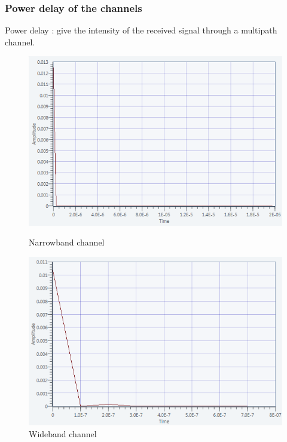 \documentclass[11pt]{beamer}
\begin{document}
\begin{frame}
\frametitle{Power delay of the channels}
 
Power delay : give the intensity of the received signal through a multipath channel. 
  
\begin{figure}[ht]
    \begin{minipage}[b]{0.48\linewidth}
        \centering \includegraphics[scale=0.35]{img/power_delay_narrow.png}
        \caption{Narrowband channel}
    \end{minipage}\hfill
    \begin{minipage}[b]{0.48\linewidth}
         \centering \includegraphics[scale=0.35]{img/power_delay_wideband.png}
         \caption{Wideband channel}
    \end{minipage}
\end{figure}

\end{frame}
\end{document}
